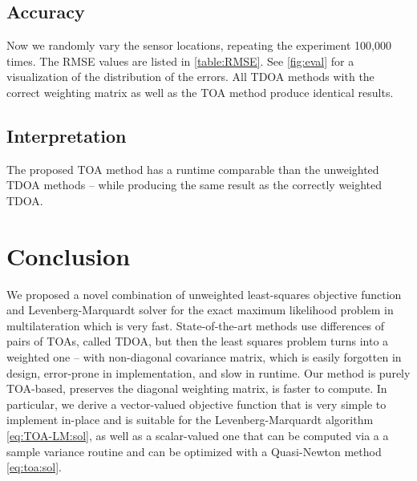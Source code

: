 \documentclass[conference]{IEEEtran}
\begin{document}
%
%
\subsection{Accuracy} 
\label{sec:eval:rmse}
Now we randomly vary the sensor locations, repeating the experiment 100,000 times. The \ac{RMSE} values are listed in \cref{table:RMSE}. See \cref{fig:eval} for a visualization of the distribution of the errors. All \ac{TDOA} methods with the correct weighting matrix as well as the \ac{TOA} method produce identical results. 

%
%
\subsection{Interpretation}
The proposed \ac{TOA} method has a runtime comparable than the unweighted \ac{TDOA} methods -- while producing the same result as the correctly weighted \ac{TDOA}. 

%
%
\section{Conclusion} 
We proposed a novel combination of unweighted least-squares objective function and Levenberg-Marquardt solver for the exact maximum likelihood problem in multilateration which is very fast. 
%
%
State-of-the-art methods use differences of pairs of \acp{TOA}, called \ac{TDOA}, but then the least squares problem turns into a weighted one -- with non-diagonal covariance matrix, which is easily forgotten in design, error-prone in implementation, and slow in runtime. Our method is purely \ac{TOA}-based, preserves the diagonal weighting matrix, is faster to compute. 
%
%
In particular, we derive a vector-valued objective function that is very simple to implement in-place and is suitable for the Levenberg-Marquardt algorithm \cref{eq:TOA-LM:sol}, as well as a scalar-valued one that can be computed via a a sample variance routine and can be optimized with a Quasi-Newton method \cref{eq:toa:sol}. 



%
%
\printbibliography
\end{document}

